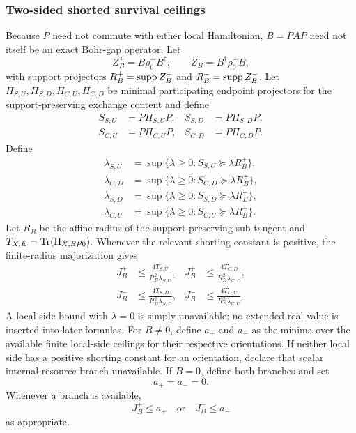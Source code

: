 \subsubsection{Two-sided shorted survival ceilings}

Because $P$ need not commute with either local Hamiltonian, $B=PAP$ need not itself be an exact Bohr-gap operator. Let
\begin{equation}
Z_B^+=B\rho_0^+B^\dagger,
\qquad
Z_B^-=B^\dagger\rho_0^+B,
\end{equation}
with support projectors $R_B^+=\operatorname{supp} Z_B^+$ and $R_B^-=\operatorname{supp} Z_B^-$. Let $\Pi_{S,U},\Pi_{S,D},\Pi_{C,U},\Pi_{C,D}$ be minimal participating endpoint projectors for the support-preserving exchange content and define
\begin{align}
S_{S,U}&=P\Pi_{S,U}P,&S_{S,D}&=P\Pi_{S,D}P,\\
S_{C,U}&=P\Pi_{C,U}P,&S_{C,D}&=P\Pi_{C,D}P.
\end{align}
Define
\begin{align}
\lambda_{S,U}&=\sup\{\lambda\ge0:S_{S,U}\succeq\lambda R_B^+\},\\
\lambda_{C,D}&=\sup\{\lambda\ge0:S_{C,D}\succeq\lambda R_B^+\},\\
\lambda_{S,D}&=\sup\{\lambda\ge0:S_{S,D}\succeq\lambda R_B^-\},\\
\lambda_{C,U}&=\sup\{\lambda\ge0:S_{C,U}\succeq\lambda R_B^-\}.
\end{align}
Let $R_B$ be the affine radius of the support-preserving sub-tangent and $T_{X,E}=\operatorname{Tr}(\Pi_{X,E}\rho_0)$. Whenever the relevant shorting constant is positive, the finite-radius majorization gives
\begin{align}
J_B^+&\le\frac{4T_{S,U}}{R_B^2\lambda_{S,U}},&
J_B^+&\le\frac{4T_{C,D}}{R_B^2\lambda_{C,D}},\\
J_B^-&\le\frac{4T_{S,D}}{R_B^2\lambda_{S,D}},&
J_B^-&\le\frac{4T_{C,U}}{R_B^2\lambda_{C,U}}.
\end{align}
A local-side bound with $\lambda=0$ is simply unavailable; no extended-real value is inserted into later formulas. For $B\ne0$, define $a_+$ and $a_-$ as the minima over the available finite local-side ceilings for their respective orientations. If neither local side has a positive shorting constant for an orientation, declare that scalar internal-resource branch unavailable. If $B=0$, define both branches and set
\begin{equation}
a_+=a_-=0.
\end{equation}
Whenever a branch is available,
\begin{equation}
J_B^+\le a_+
\quad\text{or}\quad
J_B^-\le a_-
\end{equation}
as appropriate.

